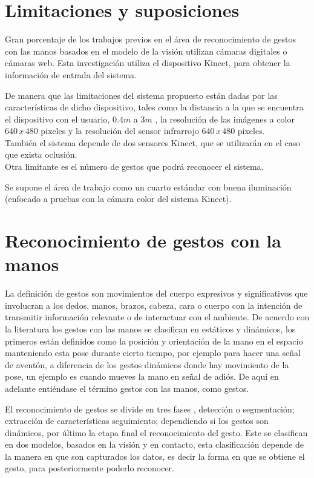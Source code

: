 \section{Limitaciones y suposiciones}\label{sec:Limitaciones&Suposiciones}

Gran porcentaje de los trabajos previos en el \'area de reconocimiento de gestos con las manos basados en el modelo de la visión  utilizan c\'amaras digitales o c\'amaras web. Esta investigación utiliza el dispositivo Kinect, para obtener la información de entrada del sistema. 

De  manera que las limitaciones del sistema propuesto están dadas por las características de dicho dispositivo, tales como la distancia a la que se encuentra el dispositivo con el usuario, $0.4m$ a $3m$ , la resolución de las imágenes a color $640 \, x \, 480$ pixeles y la resolución del sensor infrarrojo $640 \, x \, 480$ pixeles.\\
También el sistema depende de dos sensores Kinect, que se utilizar\'an en el caso que exista oclusión. \\
Otra limitante es el número de gestos que podrá reconocer el sistema.

Se supone el área de trabajo como un cuarto estándar con buena iluminación (enfocado a pruebas con la cámara color del sistema Kinect).

\section{Reconocimiento de gestos con la manos}\label{sec:ReconocimientoGestos} 


La definición de gestos \citep{Mitra2007} son movimientos del cuerpo expresivos y significativos que involucran a los dedos, manos, brazos, cabeza, cara o cuerpo con la intención de transmitir información relevante o de interactuar con el ambiente. De acuerdo con la literatura \citep{Mitra2007} los gestos con las manos se clasifican en estáticos y dinámicos, los primeros están definidos como la posición y orientación de la mano en el espacio manteniendo esta pose durante cierto tiempo, por ejemplo para hacer una se\~nal de aventón, a diferencia de los gestos dinámicos donde hay movimiento de la pose, un ejemplo  es cuando mueves la mano en se\~nal de adiós. De aquí en adelante entiéndase el término gestos con las manos, como gestos. 

El reconocimiento de gestos se divide en tres fases \citep{Rautaray2012}, detección o segmentación; extracci\'on de caracter\'isticas seguimiento; dependiendo si los gestos son dinámicos, por último la etapa final el reconocimiento del gesto.  
Este se clasifican en dos modelos, basados en la visi\'on y en contacto, esta clasificaci\'on depende de la manera en que son capturados los datos, es decir la forma en que se obtiene el gesto, para posteriormente poderlo reconocer. 

